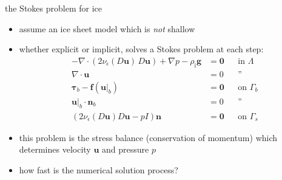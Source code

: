 \documentclass[svgnames,
               hyperref={colorlinks,citecolor=DeepPink4,linkcolor=FireBrick,urlcolor=Maroon},
               usepdftitle=false]  %
               {beamer}
\newcommand{\eps}{\epsilon}
\newcommand{\bbf}{\mathbf{f}}
\newcommand{\bn}{\mathbf{n}}
\newcommand{\bu}{\mathbf{u}}
\newcommand{\btau}{\bm{\tau}}
\newcommand{\bzero}{\bm{0}}
\newcommand{\rhoi}{\rho_{\text{i}}}
\begin{document}
\begin{frame}{the Stokes problem for ice}

\begin{itemize}
\item assume an ice sheet model which is \emph{not} shallow
\item whether explicit or implicit, solves a Stokes problem at each step:
\begin{align*}
- \nabla \cdot \left(2 \nu_\eps(D\bu)\, D\bu\right) + \nabla p - \rhoi \mathbf{g} &= \bzero && \text{in $\Lambda$} \\
\nabla \cdot \bu &= 0 && \text{''} \\
\btau_b - \bbf(\bu|_b) &= \bzero && \text{on $\Gamma_b$} \\
\bu|_b \cdot \bn_b &= 0 && \text{''} \\
\left(2 \nu_\eps(D\bu) D\bu - pI\right) \bn &= \bzero && \text{on $\Gamma_s$}
\end{align*}
\item this problem is the \alert{stress balance} (conservation of momentum) which determines velocity $\bu$ and pressure $p$
\item how fast is the numerical solution process?
\end{itemize}
\end{frame}
\end{document}
